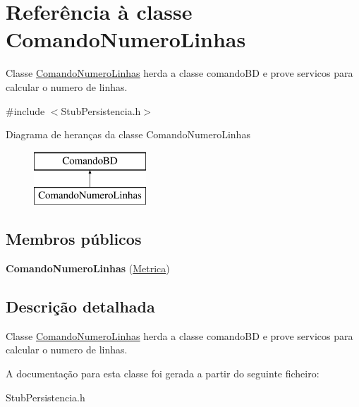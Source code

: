 \hypertarget{class_comando_numero_linhas}{
\section{\-Referência à classe \-Comando\-Numero\-Linhas}
\label{class_comando_numero_linhas}
}


\-Classe \hyperlink{class_comando_numero_linhas}{\-Comando\-Numero\-Linhas} herda a classe comando\-B\-D e prove servicos para calcular o numero de linhas.  




{\ttfamily \#include $<$\-Stub\-Persistencia.\-h$>$}

\-Diagrama de heranças da classe \-Comando\-Numero\-Linhas\begin{figure}[H]
\begin{center}
\leavevmode
\includegraphics[height=2.000000cm]{class_comando_numero_linhas}
\end{center}
\end{figure}
\subsection*{\-Membros públicos}
\begin{DoxyCompactItemize}
\item 
\hypertarget{class_comando_numero_linhas_ad22fe07f6de44d2dff2b52aa80501939}{
{\bfseries \-Comando\-Numero\-Linhas} (\hyperlink{class_metrica}{\-Metrica})}
\label{class_comando_numero_linhas_ad22fe07f6de44d2dff2b52aa80501939}

\end{DoxyCompactItemize}


\subsection{\-Descrição detalhada}
\-Classe \hyperlink{class_comando_numero_linhas}{\-Comando\-Numero\-Linhas} herda a classe comando\-B\-D e prove servicos para calcular o numero de linhas. 

\-A documentação para esta classe foi gerada a partir do seguinte ficheiro\-:\begin{DoxyCompactItemize}
\item 
\-Stub\-Persistencia.\-h\end{DoxyCompactItemize}
